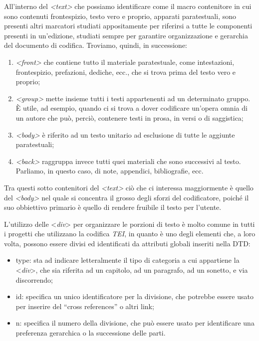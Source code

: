 \documentclass[
  b5paper,
  twoside,
  11pt,
  chapterprefix=false,
  bibliography=totocnumbered,
  listof=flat]{scrbook}
\begin{document}
All'interno del \emph{\textless text\textgreater{}} che possiamo identificare come il macro
contenitore in cui sono contenuti frontespizio, testo vero e proprio,
apparati paratestuali, sono presenti altri marcatori studiati
appositamente per riferirsi a tutte le componenti presenti in
un'edizione, studiati sempre per garantire organizzazione e gerarchia
del documento di codifica. Troviamo, quindi, in successione:

\begin{enumerate}
\def\labelenumi{\arabic{enumi}.}
\item
  \emph{\textless front\textgreater{}} che contiene tutto il materiale paratestuale, come
  intestazioni, frontespizio, prefazioni, dediche, ecc., che si trova
  prima del testo vero e proprio;
\item
  \emph{\textless group\textgreater{}} mette insieme tutti i testi appartenenti ad un
  determinato gruppo. È utile, ad esempio, quando ci si trova a dover
  codificare un'opera omnia di un autore che può, perciò, contenere
  testi in prosa, in versi o di saggistica;
\item
  \emph{\textless body\textgreater{}} è riferito ad un testo unitario ad esclusione di tutte le
  aggiunte paratestuali;
\item
  \emph{\textless back\textgreater{}} raggruppa invece tutti quei materiali che sono successivi
  al testo. Parliamo, in questo caso, di note, appendici,
  bibliografie, ecc.
\end{enumerate}

Tra questi sotto contenitori del \emph{\textless text\textgreater{}} ciò che ci interessa
maggiormente è quello del \emph{\textless body\textgreater{}} nel quale si concentra il grosso
degli sforzi del codificatore, poiché il suo obbiettivo primario è
quello di rendere fruibile il testo per l'utente.

L'utilizzo delle \textless{}\emph{div}\textgreater{} per organizzare le porzioni di testo è molto
comune in tutti i progetti che utilizzano la codifica \emph{TEI}, in quanto è
uno degli elementi che, a loro volta, possono essere divisi ed
identificati da attributi globali inseriti nella DTD:

\begin{itemize}
\item
  type: sta ad indicare letteralmente il tipo di categoria a cui
  appartiene la \textless{}\emph{div}\textgreater, che sia riferita ad un capitolo, ad un
  paragrafo, ad un sonetto, e via discorrendo;
\item
  id: specifica un unico identificatore per la divisione, che potrebbe
  essere usato per inserire del \enquote{cross references} o altri link;
\item
  n: specifica il numero della divisione, che può essere usato per
  identificare una preferenza gerarchica o la successione delle parti.
\end{itemize}
\end{document}
